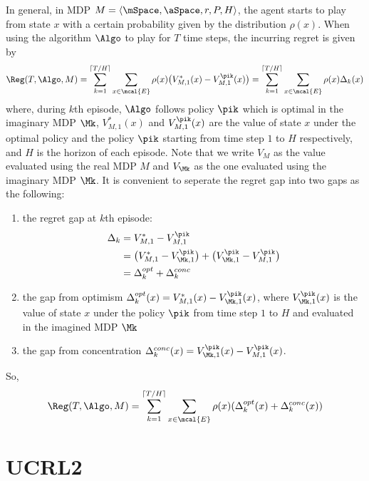         In general, in MDP $M=\langle\mSpace,\aSpace,r,P,H\rangle$, the agent starts to play from state $x$ with a certain probability given by the distribution $\rho(x)$. When using the algorithm $\Algo$ to play for $T$ time steps, the incurring regret is given by
        \begin{align}
            \Reg(T,\Algo,M)=\sum_{k=1}^{\lceil T/H\rceil}\sum_{x\in\mcal{E}}\rho(x)\big(V_{M,1}^*(x) -V_{M,1}^{\pik}(x)\big) =\sum_{k=1}^{\lceil T/H\rceil}\sum_{x\in\mcal{E}}\rho(x)\Delta_k(x)
        \end{align}
        where, during $k$th episode, $\Algo$ follows policy $\pik$ which is optimal in the imaginary MDP $\Mk$, $V^*_{M,1}(x)$ and $V_{M,1}^{\pik}(x)$ are the value of state $x$ under the optimal policy and the policy $\pik$ starting from time step $1$ to $H$ respectively, and $H$ is the horizon of each episode.
        Note that we write $V_M$ as the value evaluated using the real MDP $M$ and $V_{\Mk}$ as the one evaluated using the imaginary MDP $\Mk$. It is convenient to seperate the regret gap into two gaps as the following:
        \begin{enumerate}
            \item the regret gap at $k$th episode:
            \begin{align*}
            \Delta_k &=V_{M,1}^* -V_{M,1}^{\pik} \\
            &=\big(V^*_{M,1} -V^{\pik}_{\Mk,1}\big) +\big(V^{\pik}_{\Mk,1} -V_{M,1}^{\pik}\big) \\
            &=\Delta_k^{opt}+\Delta_k^{conc}
            \end{align*}
        \item the gap from optimism $\Delta_k^{opt}(x)=V^*_{M,1}(x) -V^{\pik}_{\Mk,1}(x)$, where $V^{\pik}_{\Mk,1}(x)$ is the value of state $x$ under the policy $\pik$ from time step $1$ to $H$ and evaluated in the imagined MDP $\Mk$
        \item the gap from concentration $\Delta_k^{conc}(x)=V^{\pik}_{\Mk,1}(x) -V_{M,1}^{\pik}(x)$.
        \end{enumerate}
        So,
        \begin{equation}
        \label{eq:eq_6}
        \Reg(T,\Algo,M)= \sum_{k=1}^{\lceil T/H\rceil}\sum_{x\in\mcal{E}}\rho(x)(\Delta_k^{opt}(x)+\Delta_k^{conc}(x))
        \end{equation}
    
    \section{UCRL2}
    \label{sec:ucrl2}
    

